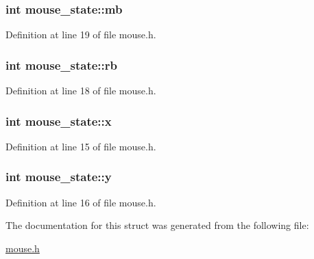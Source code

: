 \subsubsection[{mb}]{\setlength{\rightskip}{0pt plus 5cm}int mouse\+\_\+state\+::mb}\label{structmouse__state_af932ead4d69854660dbc4b63917458ee}


Definition at line 19 of file mouse.\+h.

\hypertarget{structmouse__state_aa857cd8e3060ae6155a4bbae6d01373e}{}
\subsubsection[{rb}]{\setlength{\rightskip}{0pt plus 5cm}int mouse\+\_\+state\+::rb}\label{structmouse__state_aa857cd8e3060ae6155a4bbae6d01373e}


Definition at line 18 of file mouse.\+h.

\hypertarget{structmouse__state_aa964e4da16544052d8ba173fd4a9ca5b}{}
\subsubsection[{x}]{\setlength{\rightskip}{0pt plus 5cm}int mouse\+\_\+state\+::x}\label{structmouse__state_aa964e4da16544052d8ba173fd4a9ca5b}


Definition at line 15 of file mouse.\+h.

\hypertarget{structmouse__state_a10f99b74dfdd2c8d919f3f4810b4dc68}{}
\subsubsection[{y}]{\setlength{\rightskip}{0pt plus 5cm}int mouse\+\_\+state\+::y}\label{structmouse__state_a10f99b74dfdd2c8d919f3f4810b4dc68}


Definition at line 16 of file mouse.\+h.



The documentation for this struct was generated from the following file\+:\begin{DoxyCompactItemize}
\item 
\hyperlink{mouse_8h}{mouse.\+h}\end{DoxyCompactItemize}
